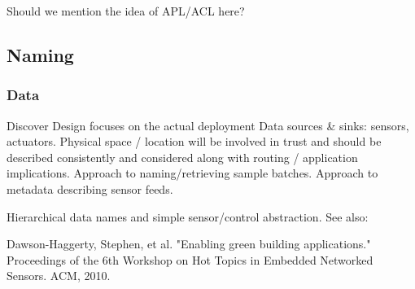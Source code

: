 Should we mention the idea of APL/ACL here?






\subsection{Naming}
\subsubsection{Data}

Discover
Design focuses on the actual deployment
Data sources \& sinks:  sensors, actuators.
Physical space / location will be involved in trust and should be described consistently and considered along with routing / application implications.
Approach to naming/retrieving sample batches. 
Approach to metadata describing sensor feeds. 

Hierarchical data names and simple sensor/control abstraction.
See also: 

Dawson-Haggerty, Stephen, et al. "Enabling green building applications." Proceedings of the 6th Workshop on Hot Topics in Embedded Networked Sensors. ACM, 2010.

